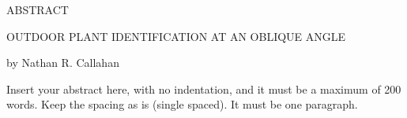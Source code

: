 \documentclass[12pt, oneside]{book}
\begin{document}
\thispagestyle{empty}
\singlespacing

\begin{center}
ABSTRACT

\vspace{2.0cm}

OUTDOOR PLANT IDENTIFICATION AT AN OBLIQUE ANGLE

\vspace{1.0cm}

by Nathan R. Callahan

\vspace{1.0cm}
\end{center}

\noindent Insert your abstract here, with no indentation, and it must be a maximum of 200 words. Keep the spacing as is (single spaced). It must be one paragraph.


\newpage

\thispagestyle{empty}

\frontmatter

\doublespacing
\end{document}
